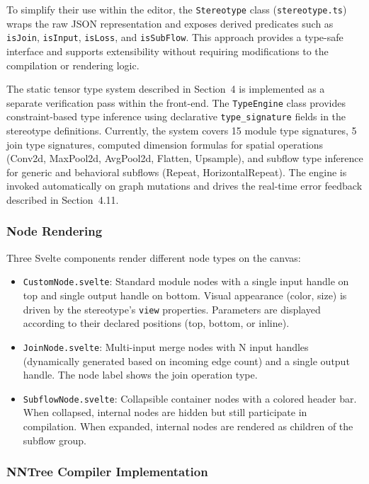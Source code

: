 \documentclass[11pt,a4paper]{article}
\begin{document}
To simplify their use within the editor, the \texttt{Stereotype} class (\texttt{stereotype.ts}) wraps the raw JSON representation and exposes derived predicates such as \texttt{isJoin}, \texttt{isInput}, \texttt{isLoss}, and \texttt{isSubFlow}. This approach provides a type-safe interface and supports extensibility without requiring modifications to the compilation or rendering logic.

The static tensor type system described in Section~4 is implemented as a separate verification pass within the front-end. The \texttt{TypeEngine} class provides constraint-based type inference using declarative \texttt{type\_signature} fields in the stereotype definitions. Currently, the system covers 15 module type signatures, 5 join type signatures, computed dimension formulas for spatial operations (Conv2d, MaxPool2d, AvgPool2d, Flatten, Upsample), and subflow type inference for generic and behavioral subflows (Repeat, HorizontalRepeat). The engine is invoked automatically on graph mutations and drives the real-time error feedback described in Section~4.11.

\subsubsection{Node Rendering}

Three Svelte components render different node types on the canvas:

\begin{itemize}
	\item \texttt{CustomNode.svelte}: Standard module nodes with a single input handle on top and single output handle on bottom. Visual appearance (color, size) is driven by the stereotype's \texttt{view} properties. Parameters are displayed according to their declared positions (top, bottom, or inline).
	\item \texttt{JoinNode.svelte}: Multi-input merge nodes with N input handles (dynamically generated based on incoming edge count) and a single output handle. The node label shows the join operation type.
	\item \texttt{SubflowNode.svelte}: Collapsible container nodes with a colored header bar. When collapsed, internal nodes are hidden but still participate in compilation. When expanded, internal nodes are rendered as children of the subflow group.
\end{itemize}

\pagebreak

\subsubsection{NNTree Compiler Implementation}
\end{document}
